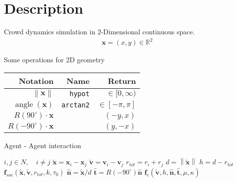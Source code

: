 \section{Description}
Crowd dynamics simulation in 2-Dimensional continuous space.
\begin{align}
\mathbf{x} = (x, y) \in \mathbb{R}^{2}
\end{align}

Some operations for 2D geometry
\begin{table}[H]
\begin{tabularx}{1.0\linewidth}{ R R R }
Notation & Name & Return \\
\hline
\hline
$ \left\| \mathbf{x} \right\| $      & \texttt{hypot} & $ \in [0, \infty) $ \\
$ \operatorname{angle}(\mathbf{x}) $ & \texttt{arctan2} & $ \in [-\pi, \pi] $ \\
$ R(90^{\circ}) \cdot \mathbf{x} $   &  & $ (-y, x) $ \\
$ R(-90^{\circ}) \cdot \mathbf{x} $  &  & $ (y, -x) $ \\
\end{tabularx}
\end{table}

Agent - Agent interaction

\begin{algorithmic}[1]
\ENSURE $ i,j \in N, \quad i \neq j $
\STATE $ \tilde{\mathbf{x}} = \mathbf{x}_{i} - \mathbf{x}_{j} $
\STATE $ \tilde{\mathbf{v}} = \mathbf{v}_{i} - \mathbf{v}_{j} $
\STATE $ r_{tot} = r_{i} + r_{j} $ 
\STATE $ d = \left\|\tilde{\mathbf{x}}\right\| $
\STATE $ h = d - r_{tot} $
\STATE
{}
\STATE $ \mathbf{f}_{soc}(\tilde{\mathbf{x}}, \tilde{\mathbf{v}}, r_{tot}, k, \tau_{0}) $
\ENDIF
\STATE
{}
\STATE $ \hat{\mathbf{n}} = \tilde{\mathbf{x}} / d $
\STATE $ \hat{\mathbf{t}} = R(-90^{\circ}) \hat{\mathbf{n}} $
\STATE $ \mathbf{f}_{c}(\tilde{\mathbf{v}}, h, \hat{\mathbf{n}}, \hat{\mathbf{t}}, \mu, \kappa) $
\ENDIF
\STATE $  $
\end{algorithmic}
